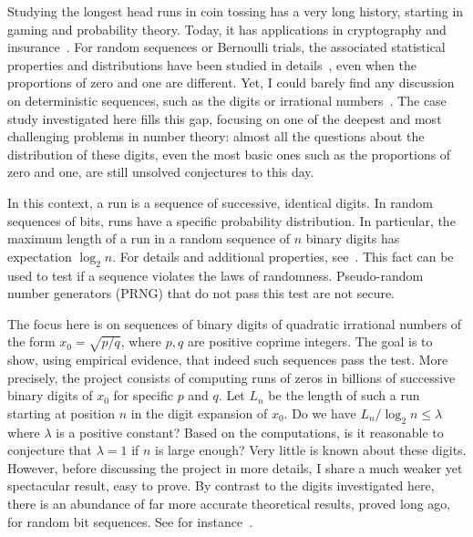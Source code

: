 \documentclass[oneside,10pt]{book}
\begin{document}
Studying the longest head runs in coin tossing has a very long history, starting in gaming and probability theory. Today, it 
 has applications in cryptography and insurance~\cite{g1594d3wes}. For random sequences
 or \textcolor{index}{Bernoulli trials}, the associated statistical properties and distributions
 have been studied in details~\cite{k1594djj}, even when the proportions of zero and one are different. Yet, I could barely find any discussion on deterministic sequences, such as the digits
 or irrational numbers~\cite{boundrun7}. The case study investigated here fills this gap, focusing on one of the deepest and most challenging problems in number theory:  almost all the questions about the distribution of these digits, even the most basic ones such as the proportions of zero and one, are still unsolved conjectures to this day. 

In this context, a \textcolor{index}{run} is a sequence of successive, identical digits. In random sequences of bits,
 runs have a specific probability distribution. In particular, the maximum length of a run in a random sequence of $n$ binary digits has expectation $\log_2 n$. For details and additional properties, see~\cite{runs45}.
This fact can be used to test if a sequence violates the laws of randomness. 
Pseudo-random number generators (\textcolor{index}{PRNG}) that do not pass 
 this test are not secure.

 The focus here is on sequences of binary digits
 of quadratic irrational numbers of the form $x_0 = \sqrt{p/q}$, where $p,q$ are positive coprime integers.  The goal is to show,
 using empirical evidence, that indeed such sequences pass the test. More precisely, the project consists of computing runs of zeros 
 in billions of successive binary digits of $x_0$ for specific $p$ and $q$. Let $L_n$ be the length of such a run starting at position $n$ in the digit
 expansion of $x_0$. Do we have 
 $L_n / \log_2 n \leq \lambda$ where $\lambda$ is a positive constant? Based on the computations, is it reasonable to conjecture that $\lambda = 1$ if
 $n$ is large enough? Very little is known about these digits. However, before discussing the project in more details, I share a much weaker yet spectacular result, easy to prove.
By contrast to the digits investigated here, there is an abundance of far more accurate theoretical results, proved long ago, for random bit sequences. See for instance~\cite{aslr4e, rizlr4e, aslimoi}.
\end{document}
